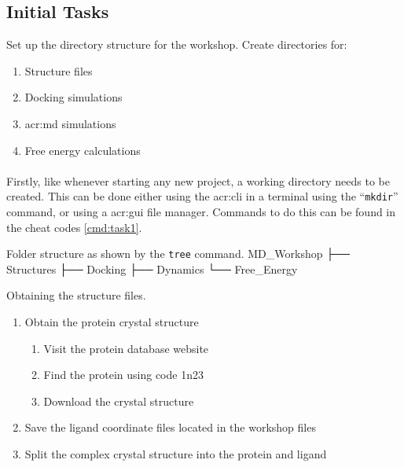 \subsection{Initial Tasks}
    \begin{task}[label=task:setup]{Set up the directory structure for the workshop.}
    Create directories for:
        \begin{enumerate}[label=(\alph*)]
            \item Structure files
            \item Docking simulations
            \item \gls{acr:md} simulations
            \item Free energy calculations
        \end{enumerate}
    \end{task}

    \paragraph{}
    Firstly, like whenever starting any new project, a working directory needs to be created. This can be done either using the \gls{acr:cli} in a terminal using the \enquote{\texttt{mkdir}} command, or using a \gls{acr:gui} file manager. Commands to do this can be found in the cheat codes \cref{cmd:task1}.

\begin{bashoutput}[label=listing:folders]{Folder structure as shown by the \texttt{tree} command.}
    MD_Workshop
    ├── Structures
    ├── Docking
    ├── Dynamics
    └── Free_Energy
\end{bashoutput}
    
    \begin{task}[label=task:Structures]{Obtaining the structure files.}
    \begin{enumerate}[label=(\alph*)]
        \item Obtain the protein crystal structure
        \begin{enumerate}[label=(\roman*)]
            \item Visit the protein database website
            \item Find the protein using code 1n23
            \item Download the crystal structure
        \end{enumerate}
        \item Save the ligand coordinate files located in the workshop files
        \item Split the complex crystal structure into the protein and ligand
    \end{enumerate}
  \end{task}

